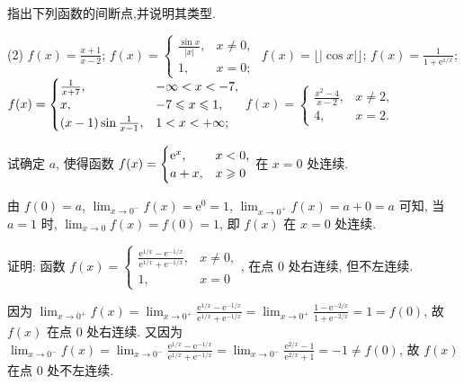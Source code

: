\begin{exercise}[2.1.6]
    指出下列函数的间断点,并说明其类型.
    \begin{tasks}[label=(\arabic*)](2)
        \task $f(x) = \frac{x+1}{x-2}$;
        \task $f(x) = \begin{cases} \frac{\sin x}{|x|}, & x \ne 0, \\ 1, & x=0; \end{cases}$
        \task $f(x) = \lfloor|\cos x|\rfloor$;
        \task $f(x) = \frac{1}{1+\mathrm{e}^{1/x}}$;
        \task $f(x) = \begin{cases} \frac{1}{x+7}, & -\infty < x < -7, \\ x, & -7 \leqslant x \leqslant 1, \\ (x-1)\sin\frac{1}{x-1}, & 1 < x < +\infty; \end{cases}$
        \task[]
        \task[(6)] $f(x) = \begin{cases} \frac{x^2-4}{x-2}, & x \ne 2, \\ 4, & x=2. \end{cases}$
    \end{tasks}
\end{exercise}

\begin{exercise}[2.1.7]
    试确定 $a$, 使得函数 $f(x) = \begin{cases} \mathrm{e}^x, & x < 0, \\ a+x, & x \geqslant 0 \end{cases}$ 在 $x=0$ 处连续.
\end{exercise}

\begin{solution}
    由 $f(0) = a$, $\lim_{x \to 0^-} f(x) = \mathrm{e}^0 = 1$, $\lim_{x \to 0^+} f(x) = a + 0 = a$ 可知, 当 $a=1$ 时, $\lim_{x \to 0} f(x) = f(0)=1$, 即 $f(x)$ 在 $x=0$ 处连续.
\end{solution}

\begin{exercise}[2.1.8]
    证明: 函数 $f(x) = \begin{cases} \frac{\mathrm{e}^{1/x}-\mathrm{e}^{-1/x}}{\mathrm{e}^{1/x}+\mathrm{e}^{-1/x}}, & x \ne 0, \\ 1, & x=0 \end{cases}$, 在点 $0$ 处右连续, 但不左连续.
\end{exercise}

\begin{solution}
    因为 $\lim_{x \to 0^+} f(x) = \lim_{x \to 0^+} \frac{\mathrm{e}^{1/x}-\mathrm{e}^{-1/x}}{\mathrm{e}^{1/x}+\mathrm{e}^{-1/x}} = \lim_{x \to 0^+} \frac{1-\mathrm{e}^{-2/x}}{1+\mathrm{e}^{-2/x}} = 1 = f(0)$, 故 $f(x)$ 在点 $0$ 处右连续. 又因为 $\lim_{x \to 0^-} f(x) = \lim_{x \to 0^-} \frac{\mathrm{e}^{1/x}-\mathrm{e}^{-1/x}}{\mathrm{e}^{1/x}+\mathrm{e}^{-1/x}} = \lim_{x \to 0^-} \frac{\mathrm{e}^{2/x}-1}{\mathrm{e}^{2/x}+1} = -1 \ne f(0)$, 故 $f(x)$ 在点 $0$ 处不左连续.
\end{solution}

